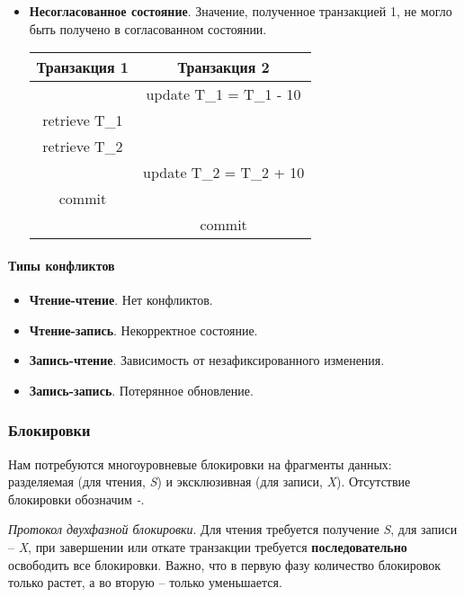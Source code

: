 \begin{itemize}
\begin{center}
\begin{tabular}{|c c|}
		      \end{tabular}
	      \end{center}
	\item \textbf{Несогласованное состояние}. Значение, полученное транзакцией 1, не могло быть
	      получено в согласованном состоянии.
	      \begin{center}
		      \begin{tabular}{|c c|}
			      \hline
			      Транзакция 1  & Транзакция 2            \\
			      \hline
			                    & update T\_1 = T\_1 - 10 \\
			      retrieve T\_1 &                         \\
			      retrieve T\_2 &                         \\
			                    & update T\_2 = T\_2 + 10 \\
			      commit        &                         \\
			                    & commit                  \\
			      \hline
		      \end{tabular}
	      \end{center}
\end{itemize}

\paragraph{Типы конфликтов}

\begin{itemize}
	\item \textbf{Чтение-чтение}. Нет конфликтов.
	\item \textbf{Чтение-запись}. Некорректное состояние.
	\item \textbf{Запись-чтение}. Зависимость от незафиксированного изменения.
	\item \textbf{Запись-запись}. Потерянное обновление.
\end{itemize}

\subsubsection{Блокировки}

Нам потребуются многоуровневые блокировки на фрагменты данных: разделяемая (для чтения,
\textit{S}) и эксклюзивная (для записи, \textit{X}). Отсутствие блокировки
обозначим \textit{-}.

\begin{definition}
	\textit{Протокол двухфазной блокировки}. Для чтения требуется получение \textit{S}, для
	записи -- \textit{X}, при завершении или откате транзакции требуется
	\textbf{последовательно} освободить все блокировки. Важно, что в первую фазу количество блокировок
	только растет, а во вторую -- только уменьшается.
\end{definition}


